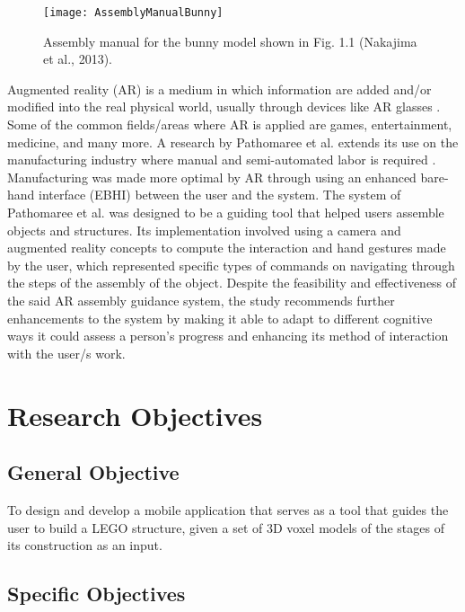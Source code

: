 \begin{figure}[h!]
  \centering
  \texttt{[image: AssemblyManualBunny]}
  \caption{Assembly manual for the bunny model shown in Fig. 1.1 (Nakajima et al., 2013).
}
\end{figure}

Augmented reality (AR) is a medium in which information are added and\slash or modified into the real physical world, usually through devices like AR glasses \cite{Craig20131}. Some of the common fields\slash areas where AR is applied are games, entertainment, medicine, and many more. A research by Pathomaree et al. extends its use on the manufacturing industry where manual and semi-automated labor is required \cite{Wang2016406}. Manufacturing was made more optimal by AR through using an enhanced bare-hand interface (EBHI) between the user and the system. The system of Pathomaree et al. was designed to be a guiding tool that helped users assemble objects and structures. Its implementation involved using a camera and augmented reality concepts to compute the interaction and hand gestures made by the user, which represented specific types of commands on navigating through the steps of the assembly of the object. Despite the feasibility and effectiveness of the said AR assembly guidance system, the study recommends further enhancements to the system by making it able to adapt to different cognitive ways it could assess a person's progress and enhancing its method of interaction with the user\slash s work.

\section{Research Objectives}
\label{sec:researchobjectives}

\subsection{General Objective}
\label{sec:generalobjective}

To design and develop a mobile application that serves as a tool that guides the user to build a LEGO structure, given a set of 3D voxel models of the stages of its construction as an input.


\subsection{Specific Objectives}
\label{sec:specificobjectives}


